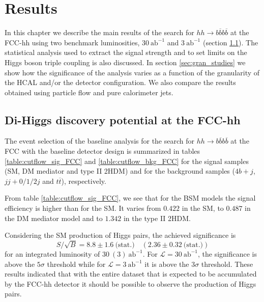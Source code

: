 
\chapter{Results}
\label{chapter:results}

In this chapter we describe the main results of the search for $hh\rightarrow b\overline{b}b\overline{b}$ at the FCC-hh using two benchmark luminosities, $30~\text{ab}^{-1}$ and $3~\text{ab}^{-1}$ (section \ref{sec:dihiggs_FCC}). The statistical analysis used to extract the signal strength and to set limits on the Higgs boson triple coupling is also discussed. In section \ref{sec:gran_studies} we show how the significance of the analysis varies as a function of the granularity of the HCAL and/or the detector configuration. We also compare the results obtained using particle flow and pure calorimeter jets.

\section{Di-Higgs discovery potential at the FCC-hh}
\label{sec:dihiggs_FCC}

The event selection of the baseline analysis for the search for $hh\rightarrow b\overline{b}b\overline{b}$ at the FCC with the baseline detector design is summarized in tables \ref{table:cutflow_sig_FCC} and \ref{table:cutflow_bkg_FCC} for the signal samples (SM, DM mediator and type II 2HDM) and for the background samples ($4b+j$, $jj+0/1/2 j$ and $t\overline{t}$), respectively.

From table \ref{table:cutflow_sig_FCC}, we see that for the BSM models the signal efficiency is higher than for the SM. It varies from $0.422$ in the SM, to $0.487$ in the DM mediator model and to $1.342$ in the type II 2HDM.

Considering the SM production of Higgs pairs, the achieved significance is
\begin{equation}
	S/\sqrt{B}=8.8\pm 1.6~\text{(stat.)}\quad (2.36\pm 0.32~\text{(stat.)})
\end{equation}
for an integrated luminosity of $30~(3)~\text{ab}^{-1}$. For $\mathcal{L}=30~\text{ab}^{-1}$, the significance is above the $5\sigma$ threshold while for $\mathcal{L}=3~\text{ab}^{-1}$ it is above the $3\sigma$ threshold. These results indicated that with the entire dataset that is expected to be accumulated by the FCC-hh detector it should be possible to observe the production of Higgs pairs.

